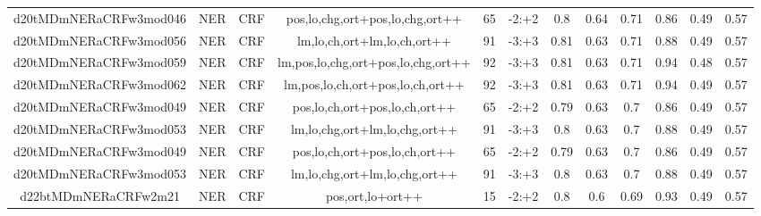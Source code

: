 \documentclass[a4paper]{article}
\begin{document}
\begin{landscape}
\begin{center}
\begin{tabular}{ |c|c|c|c|c|c|c|c|c|c|c|c|}
 
 	
 	\small{ d20tMDmNERaCRFw3mod046 } & \small{ NER} & \small{  CRF }  & pos,lo,chg,ort+pos,lo,chg,ort++  &  65 &  \small{  -2:+2 }  &  0.8 & 0.64 & 0.71  &  0.86 & 0.49 & 0.57 \\
 	

 
 	
 	\small{ d20tMDmNERaCRFw3mod056 } & \small{ NER} & \small{  CRF }  & lm,lo,ch,ort+lm,lo,ch,ort++  &  91 &  \small{  -3:+3 }  &  0.81 & 0.63 & 0.71  &  0.88 & 0.49 & 0.57 \\
 	

 
 	
 	\small{ d20tMDmNERaCRFw3mod059 } & \small{ NER} & \small{  CRF }  & lm,pos,lo,chg,ort+pos,lo,chg,ort++  &  92 &  \small{  -3:+3 }  &  0.81 & 0.63 & 0.71  &  0.94 & 0.48 & 0.57 \\
 	

 
 	
 	\small{ d20tMDmNERaCRFw3mod062 } & \small{ NER} & \small{  CRF }  & lm,pos,lo,ch,ort+pos,lo,ch,ort++  &  92 &  \small{  -3:+3 }  &  0.81 & 0.63 & 0.71  &  0.94 & 0.49 & 0.57 \\
 	

 
 	
 	\small{ d20tMDmNERaCRFw3mod049 } & \small{ NER} & \small{  CRF }  & pos,lo,ch,ort+pos,lo,ch,ort++  &  65 &  \small{  -2:+2 }  &  0.79 & 0.63 & 0.7  &  0.86 & 0.49 & 0.57 \\
 	

 
 	
 	\small{ d20tMDmNERaCRFw3mod053 } & \small{ NER} & \small{  CRF }  & lm,lo,chg,ort+lm,lo,chg,ort++  &  91 &  \small{  -3:+3 }  &  0.8 & 0.63 & 0.7  &  0.88 & 0.49 & 0.57 \\
 	

 
 	
 	\small{ d20tMDmNERaCRFw3mod049 } & \small{ NER} & \small{  CRF }  & pos,lo,ch,ort+pos,lo,ch,ort++  &  65 &  \small{  -2:+2 }  &  0.79 & 0.63 & 0.7  &  0.86 & 0.49 & 0.57 \\
 	

 
 	
 	\small{ d20tMDmNERaCRFw3mod053 } & \small{ NER} & \small{  CRF }  & lm,lo,chg,ort+lm,lo,chg,ort++  &  91 &  \small{  -3:+3 }  &  0.8 & 0.63 & 0.7  &  0.88 & 0.49 & 0.57 \\
 	

 
 	
 	\small{ d22btMDmNERaCRFw2m21 } & \small{ NER} & \small{  CRF }  & pos,ort,lo+ort++  &  15 &  \small{  -2:+2 }  &  0.8 & 0.6 & 0.69  &  0.93 & 0.49 & 0.57 \\
 	


\end{tabular}
\end{center}
\end{landscape}
\end{document}
